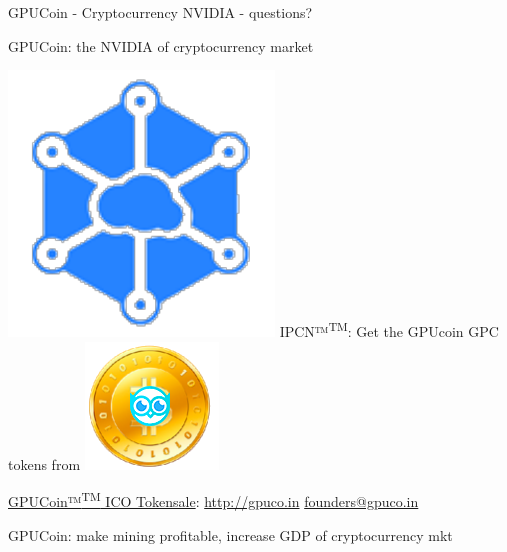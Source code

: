 \documentclass[10pt,handout]{beamer}
\begin{document}
\begin{frame}[standout]{GPUCoin - Cryptocurrency NVIDIA - questions?}
\begin{center}
GPUCoin: the NVIDIA of cryptocurrency market 
\end{center}


\includegraphics[scale=.45]{static/ipcn-p2p}
IPCN™\textsuperscript{TM}: Get the GPUcoin GPC tokens from
\includegraphics[scale=0.45]{static/hootcoin} 


 \begin{center}
\href{https://j.mp/gpucoins}{GPUCoin™\textsuperscript{TM} ICO Tokensale}: 
\url{http://gpuco.in} 
\href{mailto:founders@gpuco.in}{founders@gpuco.in} 
 \end{center}
\begin{center}
GPUCoin: make mining profitable, increase GDP of cryptocurrency mkt 
\end{center}



 \begin{center}\ccbysa\end{center}

\end{frame}



 
\end{document}
